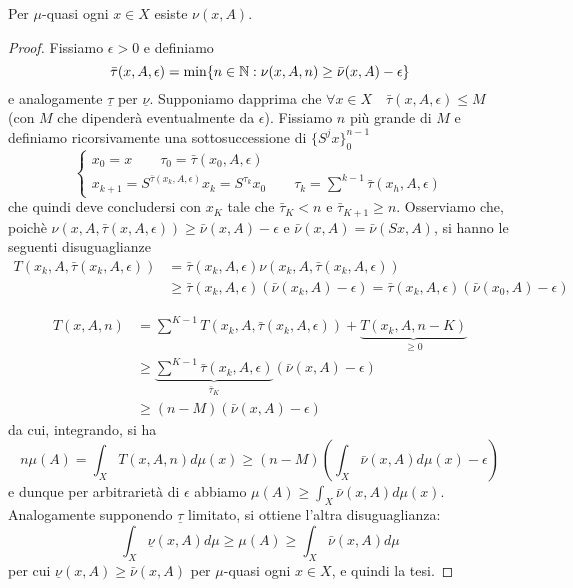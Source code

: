 \begin{teo} Per $\mu$-quasi ogni $x\in X$ esiste $\nu(x,A)$.\end{teo}
\begin{proof}
 Fissiamo $\epsilon>0$ e definiamo
 \[\bar\tau(x,A,\epsilon)=\min\{n\in\mathbb{N}:\nu(x,A,n)\geq\bar\nu(x,A)-\epsilon\}\]
 e analogamente $\underline\tau$ per $\underline\nu$. Supponiamo dapprima che $\forall x\in X \quad \bar\tau(x,A,\epsilon)\leq M$ (con $M$ che dipenderà eventualmente da $\epsilon$). Fissiamo $n$ più grande di $M$ e definiamo ricorsivamente una sottosuccessione di $\{S^jx\}_0^{n-1}$
 \[\begin{cases}
 x_0=x \qquad \tau_0=\bar\tau(x_0,A,\epsilon)\\
 x_{k+1}=S^{\bar\tau(x_k,A,\epsilon)}x_k=S^{\tau_k}x_0 \qquad \tau_k=\sum^{k-1}\bar\tau(x_h,A,\epsilon)
 \end{cases} \]
 che quindi deve concludersi con $x_{K}$ tale che $\bar\tau_{K}<n$ e $\bar\tau_{K+1}\geq n$. Osserviamo che, poichè $\nu(x,A,\bar\tau(x,A,\epsilon))\geq\bar\nu(x,A)-\epsilon$ e $\bar\nu(x,A)=\bar\nu(Sx,A)$, si hanno le seguenti disuguaglianze
 \[\begin{split}
  T(x_k,A,\bar\tau(x_k,A,\epsilon))&=\bar\tau(x_k,A,\epsilon)\nu(x_k,A,\bar\tau(x_k,A,\epsilon)) \\
  &\geq \bar\tau(x_k,A,\epsilon) (\bar\nu(x_k,A)-\epsilon)=\bar\tau(x_k,A,\epsilon)(\bar\nu(x_0,A)-\epsilon)
 \end{split}\]
 
 \[\begin{split}
  T(x,A,n)&=\sum^{K-1}T(x_k,A,\bar\tau(x_k,A,\epsilon))+\underbrace{T(x_k,A,n-K)}_{\geq 0}   \\
	  &\geq \underbrace{\sum^{K-1} \bar\tau(x_k,A,\epsilon)}_{\bar\tau_K}(\bar\nu(x,A)-\epsilon)   \\
	  &\geq (n-M)(\bar\nu(x,A)-\epsilon)
 \end{split}\]
da cui, integrando, si ha
\[n \mu(A)=\int_X T(x,A,n) d\mu(x)\geq (n-M)\left(\int_X \bar\nu(x,A)d\mu(x)-\epsilon\right)\]
e dunque per arbitrarietà di $\epsilon$ abbiamo $\mu(A)\geq \int_X \bar\nu(x,A)d\mu(x)$. Analogamente supponendo $\underline\tau$ limitato, si ottiene l'altra disuguaglianza:
\[\int_X \underline\nu(x,A)d\mu\geq\mu(A)\geq \int_X \bar\nu(x,A)d\mu\]
per cui $\underline\nu(x,A)\geq \bar\nu(x,A)$ per $\mu$-quasi ogni $x\in X$, e quindi la tesi.


\end{proof}
